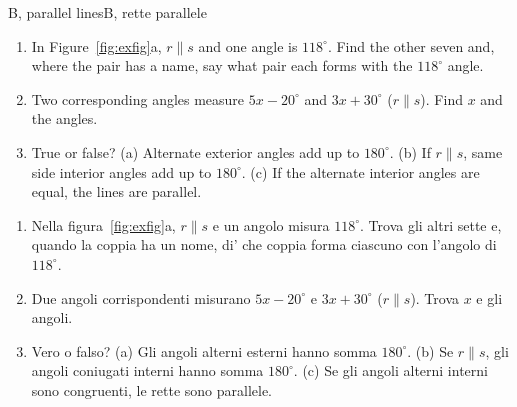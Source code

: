 \documentclass[10pt,a4paper,oneside]{book}
\begin{document}
\begin{exercise}{B, parallel lines}{B, rette parallele}
\begin{enumerate}[label=\textbf{B\arabic*.}, leftmargin=2.2em]
\item In Figure~\ref{fig:exfig}a, $r \parallel s$ and one angle is $118^\circ$. Find the other seven and, where the pair has a name, say what pair each forms with the $118^\circ$ angle.
\item Two corresponding angles measure $5x - 20^\circ$ and $3x + 30^\circ$ ($r \parallel s$). Find $x$ and the angles.
\item True or false? (a) Alternate exterior angles add up to $180^\circ$. (b) If $r \parallel s$, same side interior angles add up to $180^\circ$. (c) If the alternate interior angles are equal, the lines are parallel.
\end{enumerate}
\tcblower
\begin{enumerate}[label=\textbf{B\arabic*.}, leftmargin=2.2em]
\item Nella figura~\ref{fig:exfig}a, $r \parallel s$ e un angolo misura $118^\circ$. Trova gli altri sette e, quando la coppia ha un nome, di' che coppia forma ciascuno con l'angolo di $118^\circ$.
\item Due angoli corrispondenti misurano $5x - 20^\circ$ e $3x + 30^\circ$ ($r \parallel s$). Trova $x$ e gli angoli.
\item Vero o falso? (a) Gli angoli alterni esterni hanno somma $180^\circ$. (b) Se $r \parallel s$, gli angoli coniugati interni hanno somma $180^\circ$. (c) Se gli angoli alterni interni sono congruenti, le rette sono parallele.
\end{enumerate}
\end{exercise}
\end{document}
